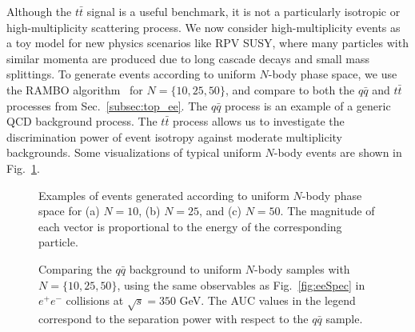 \documentclass[letterpaper,11pt]{article}
\DeclareRobustCommand{\Sec}[1]{Sec.~\ref{#1}}
\DeclareRobustCommand{\Fig}[1]{Fig.~\ref{#1}}
\begin{document}
Although the $t\bar{t}$ signal is a useful benchmark, it is not a particularly isotropic or high-multiplicity scattering process. 
%
We now consider high-multiplicity events as a toy model for new physics scenarios like RPV SUSY, where many particles with similar momenta are produced due to long cascade decays and small mass splittings. 
%
To generate events according to uniform $N$-body phase space, we use the RAMBO algorithm~\cite{Kleiss:1985gy} for $N=\{10, 25, 50\}$, and compare to both the $q\bar{q}$ and $t\bar{t}$ processes from \Sec{subsec:top_ee}.
%
The $q\bar{q}$ process is an example of a generic QCD background process.
%
The $t\bar{t}$ process allows us to investigate the discrimination power of event isotropy against moderate multiplicity backgrounds.
%
Some visualizations of typical uniform $N$-body events are shown in \Fig{fig:nBody}. 


\begin{figure}[p]
%
     \hfill
      \hfill
\caption{Examples of events generated according to uniform $N$-body phase space for (a) $N = 10$, (b) $N = 25$, and (c) $N = 50$.  The magnitude of each vector is proportional to the energy of the corresponding particle.}
%
\label{fig:nBody}
\end{figure}


\begin{figure}[p]
%
\centering
{}
     \hfill
      \hfill
      \hfill
\caption{Comparing the $q\bar{q}$ background to uniform $N$-body samples with $N = \{10,25,50\}$, using the same observables as \Fig{fig:eeSpec} in $e^+e^-$ collisions at $\sqrt{s} = 350$ GeV.
%
The AUC values in the legend correspond to the separation power with respect to the $q\bar{q}$ sample.}
%
\label{fig:eeRamboSpec}
\end{figure}
\end{document}
